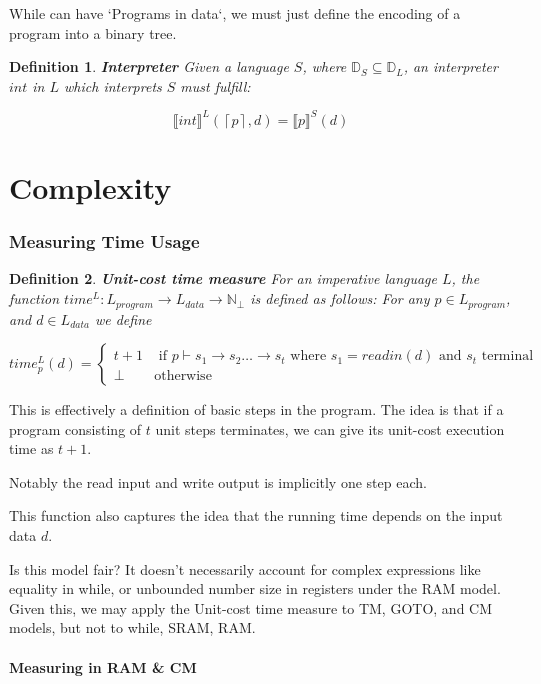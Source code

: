 \documentclass[a4paper, final]{article}
\newcommand{\enc}[1]{\left\lceil#1\right\rceil}
\newtheorem{definition}{Definition}
\begin{document}
While can have `Programs in data`, we must just define the encoding of a program into a binary tree.

\begin{definition}
	\textbf{Interpreter}
	Given a language $S$, where $\mathbb{D}_S\subseteq\mathbb{D}_L$, an interpreter
	$int$ in $L$ which interprets $S$ must fulfill:

	$$\llbracket int \rrbracket^L(\enc{p}, d)=\llbracket p \rrbracket^S(d)$$
\end{definition}

\part{Complexity}
\section{Measuring Time Usage}

\begin{definition}
	\textbf{Unit-cost time measure}
	For an imperative language $L$, the function $time^L:L_{program}\to L_{data}\to\mathbb{N}_\bot$ is defined as follows:
	For any $p\in L_{program}$, and $d\in L_{data}$ we define

	$$
		time^L_p(d)=
		\begin{cases}
			t+1  & \textrm{ if }p\vdash s_1\to s_2\ldots\to s_t \textrm{ where } s_1=readin(d) \textrm{ and } s_t \textrm{ terminal} \\
			\bot & \textrm{otherwise}
		\end{cases}
	$$
\end{definition}

This is effectively a definition of basic steps in the program. The idea is that if a program
consisting of $t$ unit steps terminates, we can give its unit-cost execution time as $t+1$.

Notably the read input and write output is implicitly one step each.

This function also captures the idea that the running time depends on the input data $d$.

Is this model fair? It doesn't necessarily account for complex expressions like equality in while,
or unbounded number size in registers under the RAM model. Given this, we may apply the Unit-cost
time measure to TM, GOTO, and CM models, but not to while, SRAM, RAM.

\subsection{Measuring in RAM \& CM}
\end{document}
